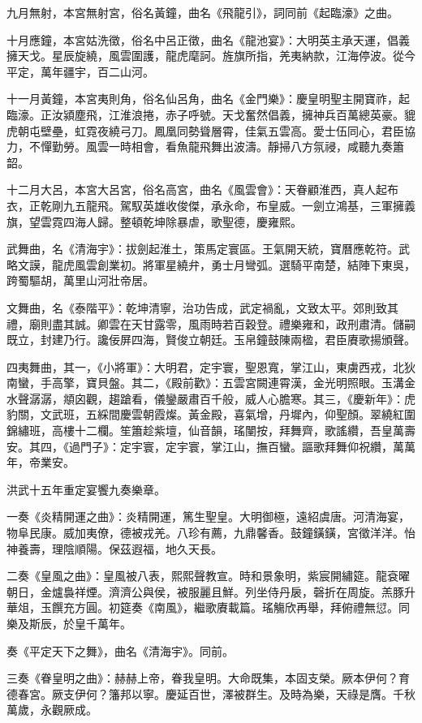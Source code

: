 九月無射，本宮無射宮，俗名黃鐘，曲名《飛龍引》，詞同前《起臨濠》之曲。

十月應鐘，本宮姑洗徵，俗名中呂正徵，曲名《龍池宴》：大明英主承天運，倡義擁天戈。星辰旋繞，風雲圍護，龍虎麾訶。旌旗所指，羌夷納款，江海停波。從今平定，萬年疆宇，百二山河。

十一月黃鐘，本宮夷則角，俗名仙呂角，曲名《金門樂》：慶皇明聖主開寶祚，起臨濠。正汝潁塵飛，江淮浪捲，赤子呼號。天戈奮然倡義，擁神兵百萬總英豪。貔虎朝屯壁壘，虹霓夜繞弓刀。鳳凰同勢聳層霄，佳氣五雲高。愛士伍同心，君臣協力，不憚勤勞。風雲一時相會，看魚龍飛舞出波濤。靜掃八方氛祲，咸聽九奏簫韶。

十二月大呂，本宮大呂宮，俗名高宮，曲名《風雲會》：天眷顧淮西，真人起布衣，正乾剛九五龍飛。駕馭英雄收俊傑，承永命，布皇威。一劍立鴻基，三軍擁義旗，望雲霓四海人歸。整頓乾坤除暴虐，歌聖德，慶雍熙。

武舞曲，名《清海宇》：拔劍起淮土，策馬定寰區。王氣開天統，寶曆應乾符。武略文謨，龍虎風雲創業初。將軍星繞弁，勇士月彎弧。選騎平南楚，結陣下東吳，跨蜀驅胡，萬里山河壯帝居。

文舞曲，名《泰階平》：乾坤清寧，治功告成，武定禍亂，文致太平。郊則致其禮，廟則盡其誠。卿雲在天甘露零，風雨時若百穀登。禮樂雍和，政刑肅清。儲嗣既立，封建乃行。讒佞屏四海，賢俊立朝廷。玉帛鐘鼓陳兩楹，君臣賡歌揚頒聲。

四夷舞曲，其一，《小將軍》：大明君，定宇寰，聖恩寬，掌江山，東虜西戎，北狄南蠻，手高擎，寶貝盤。其二，《殿前歡》：五雲宮闕連霄漢，金光明照眼。玉溝金水聲潺潺，頫囟觀，趨蹌看，儀鑾嚴肅百千般，威人心膽寒。其三，《慶新年》：虎豹關，文武班，五綵間慶雲朝霞燦。黃金殿，喜氣增，丹墀內，仰聖顏。翠繞紅圍錦繡班，高樓十二欄。笙簫趁紫壇，仙音韻，瑤闉按，拜舞齊，歌謠纘，吾皇萬壽安。其四，《過門子》：定宇寰，定宇寰，掌江山，撫百蠻。謳歌拜舞仰祝纘，萬萬年，帝業安。

洪武十五年重定宴饗九奏樂章。

一奏《炎精開運之曲》：炎精開運，篤生聖皇。大明御極，遠紹虞唐。河清海宴，物阜民康。威加夷僚，德被戎羌。八珍有薦，九鼎馨香。鼓鐘鐄鐄，宮徵洋洋。怡神養壽，理陰順陽。保茲遐福，地久天長。

二奏《皇風之曲》：皇風被八表，熙熙聲教宣。時和景象明，紫宸開繡筵。龍袞曜朝日，金爐裊祥煙。濟濟公與侯，被服麗且鮮。列坐侍丹扆，磬折在周旋。羔豚升華俎，玉饌充方圓。初筵奏《南風》，繼歌賡載篇。瑤觴欣再舉，拜俯禮無愆。同樂及斯辰，於皇千萬年。

奏《平定天下之舞》，曲名《清海宇》。同前。

三奏《眷皇明之曲》：赫赫上帝，眷我皇明。大命既集，本固支榮。厥本伊何？育德春宮。厥支伊何？籓邦以寧。慶延百世，澤被群生。及時為樂，天祿是膺。千秋萬歲，永觀厥成。

